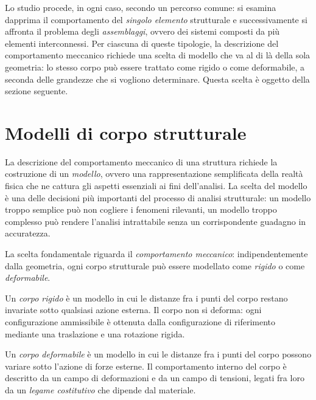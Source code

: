 Lo studio procede, in ogni caso, secondo un percorso  comune: si esamina dapprima il comportamento del \textit{singolo elemento} strutturale e successivamente si affronta il problema degli \textit{assemblaggi}, ovvero dei sistemi composti da più elementi
interconnessi. Per ciascuna di queste tipologie, la descrizione del comportamento meccanico richiede una scelta di modello che va al di là della sola geometria: lo stesso corpo può essere trattato come rigido o come deformabile, a seconda delle grandezze che si vogliono determinare. Questa scelta è oggetto della sezione seguente.

\section{Modelli di corpo strutturale}

La descrizione del comportamento meccanico di una struttura richiede la costruzione di un \textit{modello}, ovvero una rappresentazione semplificata della realtà fisica che ne cattura gli aspetti essenziali ai fini dell'analisi. La scelta del modello è una delle decisioni più importanti del processo di analisi strutturale: un modello troppo semplice può non cogliere i fenomeni rilevanti, un modello troppo complesso può rendere l'analisi intrattabile senza un corrispondente guadagno in accuratezza.

La scelta fondamentale riguarda il \textit{comportamento meccanico}: indipendentemente dalla geometria, ogni corpo strutturale può essere modellato come \textit{rigido} o come \textit{deformabile}.

\begin{definizione}
	Un \emph{corpo rigido} è un modello in cui le distanze fra i punti del corpo restano invariate sotto qualsiasi azione esterna. Il corpo non si deforma: ogni configurazione ammissibile è ottenuta dalla configurazione di riferimento mediante una traslazione e una rotazione rigida.
\end{definizione}

\begin{definizione}
	Un \emph{corpo deformabile} è un modello in cui le distanze fra i punti del corpo possono variare sotto l'azione di forze esterne. Il comportamento interno del corpo è descritto da un campo di deformazioni e da un campo di tensioni, legati fra loro da un \textit{legame costitutivo} che dipende dal materiale.
\end{definizione}

